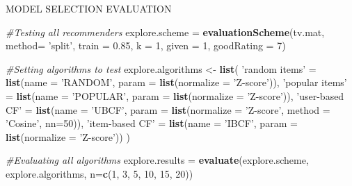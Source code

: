 \documentclass[
  ignorenonframetext,
]{beamer}
\newenvironment{Shaded}{\begin{snugshade}}{\end{snugshade}}
\newcommand{\CommentTok}[1]{\textcolor[rgb]{0.56,0.35,0.01}{\textit{#1}}}
\newcommand{\DataTypeTok}[1]{\textcolor[rgb]{0.13,0.29,0.53}{#1}}
\newcommand{\DecValTok}[1]{\textcolor[rgb]{0.00,0.00,0.81}{#1}}
\newcommand{\FloatTok}[1]{\textcolor[rgb]{0.00,0.00,0.81}{#1}}
\newcommand{\KeywordTok}[1]{\textcolor[rgb]{0.13,0.29,0.53}{\textbf{#1}}}
\newcommand{\NormalTok}[1]{#1}
\newcommand{\StringTok}[1]{\textcolor[rgb]{0.31,0.60,0.02}{#1}}
\begin{document}
\begin{frame}[fragile]{MODEL SELECTION EVALUATION}
\protect\hypertarget{model-selection-evaluation}{}

\begin{Shaded}
\begin{Highlighting}[]
\CommentTok{#Testing all recommenders}
\NormalTok{explore.scheme =}\StringTok{ }\KeywordTok{evaluationScheme}\NormalTok{(tv.mat, }\DataTypeTok{method=} \StringTok{'split'}\NormalTok{, }\DataTypeTok{train =} \FloatTok{0.85}\NormalTok{, }\DataTypeTok{k =} \DecValTok{1}\NormalTok{, }\DataTypeTok{given =} \DecValTok{1}\NormalTok{, }\DataTypeTok{goodRating =} \DecValTok{7}\NormalTok{)}

\CommentTok{#Setting algorithms to test}
\NormalTok{explore.algorithms <-}\StringTok{ }\KeywordTok{list}\NormalTok{(}
  \StringTok{'random items'}\NormalTok{ =}\StringTok{ }\KeywordTok{list}\NormalTok{(}\DataTypeTok{name =} \StringTok{'RANDOM'}\NormalTok{, }\DataTypeTok{param =} \KeywordTok{list}\NormalTok{(}\DataTypeTok{normalize =} \StringTok{'Z-score'}\NormalTok{)),}
  \StringTok{'popular items'}\NormalTok{ =}\StringTok{ }\KeywordTok{list}\NormalTok{(}\DataTypeTok{name =} \StringTok{'POPULAR'}\NormalTok{, }\DataTypeTok{param =} \KeywordTok{list}\NormalTok{(}\DataTypeTok{normalize =} \StringTok{'Z-score'}\NormalTok{)),}
  \StringTok{'user-based CF'}\NormalTok{ =}\StringTok{ }\KeywordTok{list}\NormalTok{(}\DataTypeTok{name =} \StringTok{'UBCF'}\NormalTok{, }\DataTypeTok{param =} \KeywordTok{list}\NormalTok{(}\DataTypeTok{normalize =} \StringTok{'Z-score'}\NormalTok{, }\DataTypeTok{method =} \StringTok{'Cosine'}\NormalTok{, }\DataTypeTok{nn=}\DecValTok{50}\NormalTok{)),}
  \StringTok{'item-based CF'}\NormalTok{ =}\StringTok{ }\KeywordTok{list}\NormalTok{(}\DataTypeTok{name =} \StringTok{'IBCF'}\NormalTok{, }\DataTypeTok{param =} \KeywordTok{list}\NormalTok{(}\DataTypeTok{normalize =} \StringTok{'Z-score'}\NormalTok{))}
\NormalTok{  )}

\CommentTok{#Evaluating all algorithms}
\NormalTok{explore.results =}\StringTok{ }\KeywordTok{evaluate}\NormalTok{(explore.scheme, explore.algorithms, }\DataTypeTok{n=}\KeywordTok{c}\NormalTok{(}\DecValTok{1}\NormalTok{, }\DecValTok{3}\NormalTok{, }\DecValTok{5}\NormalTok{, }\DecValTok{10}\NormalTok{, }\DecValTok{15}\NormalTok{, }\DecValTok{20}\NormalTok{))}
\end{Highlighting}
\end{Shaded}

\end{frame}
\end{document}
